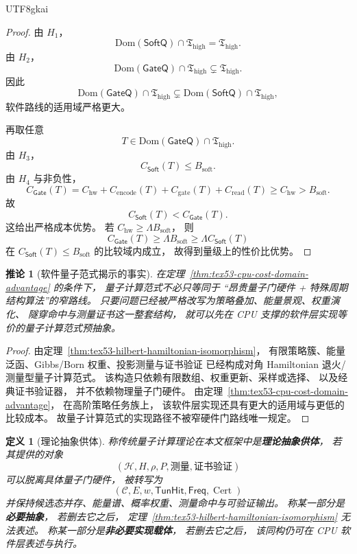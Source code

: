 \documentclass[12pt]{article}
\newtheorem{definition}{定义}[section]
\newtheorem{corollary}{推论}[section]
\newcommand{\TunHit}{\mathsf{TunHit}}
\newcommand{\Freq}{\mathsf{Freq}}
\newcommand{\Hilb}{\mathcal H}
\newcommand{\Cert}{\operatorname{Cert}}
\begin{document}
\begin{CJK*}{UTF8}{gkai}
\begin{proof}
由 \(H_1\)，
\[
  \mathrm{Dom}(\mathsf{SoftQ})\cap\mathfrak T_{\mathrm{high}}
  =
  \mathfrak T_{\mathrm{high}}.
\]
由 \(H_2\)，
\[
  \mathrm{Dom}(\mathsf{GateQ})\cap\mathfrak T_{\mathrm{high}}
  \subsetneq
  \mathfrak T_{\mathrm{high}}.
\]
因此
\[
  \mathrm{Dom}(\mathsf{GateQ})\cap\mathfrak T_{\mathrm{high}}
  \subsetneq
  \mathrm{Dom}(\mathsf{SoftQ})\cap\mathfrak T_{\mathrm{high}},
\]
软件路线的适用域严格更大。

再取任意
\[
  T\in\mathrm{Dom}(\mathsf{GateQ})\cap\mathfrak T_{\mathrm{high}}.
\]
由 \(H_3\)，
\[
  C_{\mathsf{Soft}}(T)\le B_{\mathrm{soft}}.
\]
由 \(H_4\) 与非负性，
\[
  C_{\mathsf{Gate}}(T)
  =
  C_{\mathrm{hw}}+
  C_{\mathrm{encode}}(T)+
  C_{\mathrm{gate}}(T)+
  C_{\mathrm{read}}(T)
  \ge
  C_{\mathrm{hw}}
  >
  B_{\mathrm{soft}}.
\]
故
\[
  C_{\mathsf{Soft}}(T)<C_{\mathsf{Gate}}(T).
\]
这给出严格成本优势。
若 \(C_{\mathrm{hw}}\ge\Lambda B_{\mathrm{soft}}\)，
则
\[
  C_{\mathsf{Gate}}(T)
  \ge
  \Lambda B_{\mathrm{soft}}
  \ge
  \Lambda C_{\mathsf{Soft}}(T)
\]
在 \(C_{\mathsf{Soft}}(T)\le B_{\mathrm{soft}}\) 的比较域内成立，
故得到量级上的性价比优势。
\end{proof}

\begin{corollary}[软件量子范式揭示的事实]
\label{cor:tex53-software-quantum-fact}
在定理~\ref{thm:tex53-cpu-cost-domain-advantage} 的条件下，
量子计算范式不必只等同于
“昂贵量子门硬件 + 特殊周期结构算法”的窄路线。
只要问题已经被严格改写为策略叠加、能量景观、权重演化、
隧穿命中与测量证书这一整套结构，
就可以先在 CPU 支撑的软件层实现等价的量子计算范式预抽象。
\end{corollary}

\begin{proof}
由定理~\ref{thm:tex53-hilbert-hamiltonian-isomorphism}，
有限策略簇、能量泛函、Gibbs/Born 权重、投影测量与证书验证
已经构成对角 Hamiltonian 退火/测量型量子计算范式。
该构造只依赖有限数组、权重更新、采样或选择、
以及经典证书验证器，
并不依赖物理量子门硬件。
由定理~\ref{thm:tex53-cpu-cost-domain-advantage}，
在高阶策略任务族上，
该软件层实现还具有更大的适用域与更低的比较成本。
故量子计算范式的实现路径不被窄硬件门路线唯一规定。
\end{proof}

\begin{definition}[理论抽象供体]
\label{def:tex53-abstraction-provider}
称传统量子计算理论在本文框架中是\textbf{理论抽象供体}，
若其提供的对象
\[
  (\Hilb,H,\rho,P,\text{测量},\text{证书验证})
\]
可以脱离具体量子门硬件，
被转写为
\[
  (\mathcal C,E,w,\TunHit,\Freq,\Cert)
\]
并保持候选态并存、能量谱、概率权重、测量命中与可验证输出。
称某一部分是\textbf{必要抽象}，
若删去它之后，
定理~\ref{thm:tex53-hilbert-hamiltonian-isomorphism} 无法表述。
称某一部分是\textbf{非必要实现载体}，
若删去它之后，
该同构仍可在 CPU 软件层表述与执行。
\end{definition}


\end{CJK*}
\end{document}

